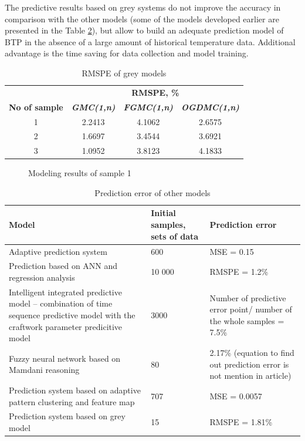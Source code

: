 \documentclass[AMS,STIX2COL]{WileyNJD-v2}
\begin{document}
The predictive results based on grey systems do not improve the accuracy in comparison with the other models (some of the models developed earlier are presented in the Table \ref{tab:PredictionOtherModel}), but allow to build an adequate prediction model of BTP in the absence of a large amount of historical temperature data. Additional advantage is the time saving for data collection and model training. 
\begin{center}
	\begin{table}[t]
		\centering
		\caption{RMSPE of grey models} \label{tab:RMSPE1}
		\begin{tabular*}{500pt}{@{\extracolsep\fill}cccc@{\extracolsep\fill}}
			\toprule
			&\multicolumn{3}{c}{\textbf{RMSPE, \%}} \\
			\cmidrule{2-4} 
			\textbf{No of sample} & \textbf{\textit{GMC(1,n)}}& \textbf{\textit{FGMC(1,n)}}& \textbf{\textit{OGDMC(1,n)}} \\
			\midrule
			1 & 2.2413 & 4.1062 & 2.6575 \\
			2 & 1.6697 & 3.4544 & 3.6921 \\
			3 & 1.0952 & 3.8123 & 4.1833 \\
			\bottomrule
		\end{tabular*}
	\end{table}
\end{center}
\begin{figure}[t]
	\centering
	\caption{Modeling results of sample 1} \label{fig:GMsSample1}
\end{figure}

	\begin{center}
	\begin{table}[t]
	\caption{Prediction error of other models} \label{tab:PredictionOtherModel}
		\begin{tabular*}{500pt}{@{\extracolsep\fill}p{8 cm}p{3 cm}p{5.5 cm}@{\extracolsep\fill}}
			\toprule
			\textbf{Model} & \textbf{Initial samples, sets of data}& \textbf{Prediction error}\\
			\midrule
			Adaptive prediction system \cite{Feng2000}& 600 & MSE = 0.15\\
			\midrule
			Prediction based on ANN and regression analysis \cite{Wang2009}& 10 000& RMSPE = 1.2\%\\
			\midrule
			Intelligent integrated predictive model – combination of time sequence predictive model with the craftwork parameter predicitive model \cite{Wu2006} & 3000& Number of predictive error point/ number of the whole samples	 = 7.5\%\\
			\midrule
			Fuzzy neural network based on Mamdani reasoning \cite{Wang2014}& 80& 2.17\% (equation to find out prediction error is not mention in article)\\
			\midrule
			Prediction system based on adaptive pattern clustering and feature map \cite{Cheng2006}& 707& MSE = 0.0057 \\
			\midrule
			Prediction system based on grey model& 15& RMSPE = 1.81\% \\
			\bottomrule
		\end{tabular*}
\end{table} 
\end{center}
\end{document}
